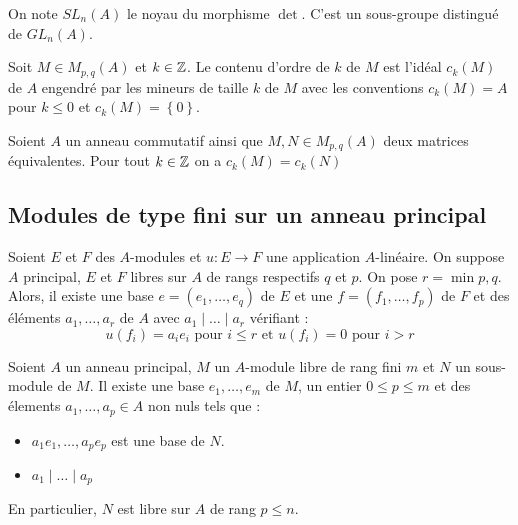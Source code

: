\documentclass{cours}
\begin{document}
\begin{definition}
    On note $SL_{n}(A)$ le noyau du morphisme $\det$. C'est un sous-groupe distingué de $GL_{n}(A)$.
\end{definition}

\begin{definition}
    Soit $M \in M_{p, q}(A)$ et $k \in \mathbb{Z}$. Le contenu d'ordre de $k$ de $M$ est l'idéal $c_{k}(M)$ de $A$ engendré par les mineurs de taille $k$ de $M$ avec les conventions $c_{k}(M) = A$ pour $k \leq 0$ et $c_{k}(M) = \left\{0\right\}$.
\end{definition}

\begin{lemma}
    Soient $A$ un anneau commutatif ainsi que $M, N \in M_{p, q}(A)$ deux matrices équivalentes. Pour tout $k \in \mathbb{Z}$ on a $c_{k}(M) = c_{k}(N)$
\end{lemma}

\subsection{Modules de type fini sur un anneau principal}
\begin{theorem}
    Soient $E$ et $F$ des $A$-modules et $u : E \to F$ une application $A$-linéaire. On suppose $A$ principal, $E$ et $F$ libres sur $A$ de rangs respectifs $q$ et $p$. On pose $r = \min p, q$.
    Alors, il existe une base $e = \left(e_{1},\ldots, e_{q}\right)$ de $E$ et une $f = \left(f_{1}, \ldots, f_{p}\right)$ de $F$ et des éléments $a_{1}, \ldots, a_{r}$ de $A$ avec $a_{1} \mid \ldots \mid a_{r}$ vérifiant : 
    \[
        u(f_{i}) = a_{i}e_{i} \text{ pour } i \leq r \text{ et } u(f_{i}) = 0 \text{ pour } i > r
    \]
\end{theorem}

\begin{theorem}
    Soient $A$ un anneau principal, $M$ un $A$-module libre de rang fini $m$ et $N$ un sous-module de $M$. Il existe une base $e_{1}, \ldots, e_{m}$ de $M$, un entier $0 \leq p \leq m$ et des élements $a_{1}, \ldots, a_{p} \in A$ non nuls tels que : 
    \begin{itemize}
        \item $a_{1}e_{1}, \ldots, a_{p}e_{p}$ est une base de $N$.
        \item $a_{1} \mid \ldots \mid a_{p}$
    \end{itemize}
    En particulier, $N$ est libre sur $A$ de rang $p \leq n$. 
\end{theorem}
\end{document}
